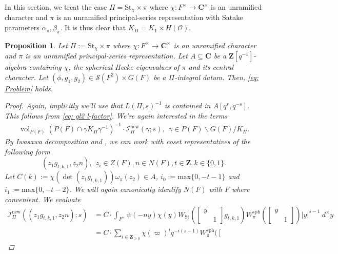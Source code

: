 \documentclass{amsart}
\theoremstyle{plain}
\newtheorem{prop}[thm]{Proposition}
\theoremstyle{plain}
\theoremstyle{remark}
\DeclareMathOperator{\vol}{vol}
\begin{document}
 In this section, we treat the case $\Pi=\mathrm{St}_\chi\times \pi$ where $\chi:F^\times\rightarrow \mathbf{C}^\times$ is an unramified character and $\pi$ is an unramified principal-series representation with Satake parameters $\alpha_\pi,\beta_\pi$. It is thus clear that $K_\Pi=K_1\times H(\mathcal{O})$. 
 \begin{prop}\label{thm unram + steinberg}
     Let $\Pi:=\mathrm{St}_\chi\times \pi$ where $\chi:F^\times\rightarrow \mathbf{C}^\times$ is an unramified character and $\pi$ is an unramified principal-series representation. Let $A\subseteq \mathbf{C}$ be a $\mathbf{Z}[q^{-1}]$-algebra containing $\chi$, the spherical Hecke eigenvalues of $\pi$ and its central character. Let $(\phi,g_1,g_2)\in \mathcal{S}(F^2)\times G(F)$ be a $\Pi$-integral datum. Then, \eqref{eq: Problem} holds.
     \begin{proof}
         Again, implicitly we'll use that $L(\Pi,s)^{-1}$ is contained in $A[q^s,q^{-s}]$. This follows from \eqref{eq: gl2 l-factor}. We're again interested in the terms 
         \begin{align}
            \vol_{P(F)}(P(F)\cap \gamma K_\Pi \gamma^{-1})^{-1}\cdot \mathcal{I}_{\Pi}^\mathrm{new}(\gamma ;s),\ \ \gamma\in P(F)\backslash G(F)/K_\Pi.
        \end{align}
        By Iwasawa decomposition and , we can work with coset representatives of the following form
         $$(z_1g_{t,k,1},z_2n),\ \ z_i\in Z(F),n\in N(F),t\in\mathbf{Z},k\in\{0,1\}.$$
        Let $C(k):=\chi(\det(z_1g_{t,k,1}))\omega_{\pi}(z_2)\in A$, $i_0:=\mathrm{max}\{0,-t-1\}$ and $i_1:=\mathrm{max}\{0,-t-2\}$. We will again canonically identify $N(F)$ with $F$ where convenient. We evaluate
        \begin{align*}
           \mathcal{I}_\Pi^\mathrm{new}((z_1g_{t,k,1}, z_2n);s)&=
            C\cdot \int_{F^\times}\psi(-ny)\chi(y)W_{\mathrm{St}}(\left[\begin{smallmatrix}
                y & \\
                & 1
            \end{smallmatrix}\right]g_{t,k,1})W_\pi^\mathrm{sph}(\left[\begin{smallmatrix}
                y & \\
                 & 1
            \end{smallmatrix}\right])|y|^{s-1}\ d^\times y\\
           &= {C\cdot \sum_{i\in\mathbf{Z}_{\geq 0}} \chi(\varpi)^i q^{-i(s-1)}W_\pi^\mathrm{sph}(\left[\begin{smallmatrix}

\end{smallmatrix}}
\end{align*}
\end{proof}
\end{prop}
\end{document}
